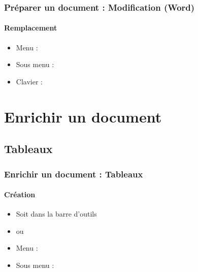\documentclass[xcolor=table]{beamer}
\begin{document}
\begin{frame}[t]
\frametitle{Préparer un document : Modification (Word)}
\framesubtitle{Remplacement}

\begin{minipage}{0.38\textwidth}
	\begin{itemize}
		\item Menu : 
		\item Sous menu : 
		\item Clavier : 
	\end{itemize}
\end{minipage}
\begin{minipage}{0.6\textwidth}	
\end{minipage}

\end{frame}

\section{Enrichir un document}

%

\subsection{Tableaux}

\begin{frame}
\frametitle{Enrichir un document : Tableaux}
\framesubtitle{Création}

\begin{minipage}{0.38\textwidth}
	\begin{itemize}
		\item Soit dans la barre d'outils
		\item ou
		\item Menu : 
		\item Sous menu : 
	\end{itemize}
\end{minipage}
\begin{minipage}{0.20\textwidth}	
\end{minipage}
\begin{minipage}{0.40\textwidth}	
\end{minipage}

\end{frame}
\end{document}
